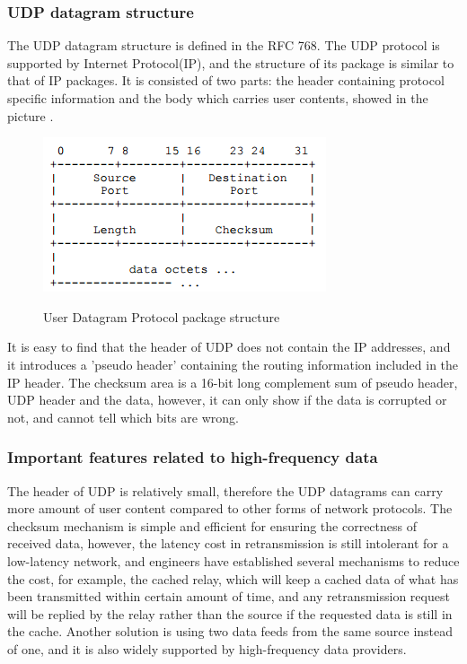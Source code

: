 \documentclass[11pt,openright,a4paper]{report}
\begin{document}
\subsubsection{UDP datagram structure}
The UDP datagram structure is defined in the RFC 768\cite{postel1980user}. The UDP protocol is supported by Internet Protocol(IP), and the structure of its package is similar to that of IP packages. It is consisted of two parts: the header containing protocol specific information and the body which carries user contents, showed in the picture .
\begin{figure}[H]
	\centering
	\includegraphics[width=0.5\linewidth]{picture/UDPStructure}
	\caption{User Datagram Protocol package structure}\cite{postel1980user}
	\label{fig:UDPStructure}
\end{figure}
It is easy to find that the header of UDP does not contain the IP addresses, and it introduces a 'pseudo header' containing the routing information included in the IP header. The checksum area is a 16-bit long complement sum of pseudo header, UDP header and the data, however, it can only show if the data is corrupted or not, and cannot tell which bits are wrong.\\
\subsubsection{Important features related to high-frequency data}
The header of UDP is relatively small, therefore the UDP datagrams can carry more amount of user content compared to other forms of network protocols. The checksum mechanism is simple and efficient for ensuring the correctness of received data, however, the latency cost in retransmission is still intolerant for a low-latency network, and engineers have established several mechanisms to reduce the cost, for example, the cached relay, which will keep a cached data of what has been transmitted within certain amount of time, and any retransmission request will be replied by the relay rather than the source if the requested data is still in the cache. Another solution is using two data feeds from the same source instead of one, and it is also widely supported by high-frequency data providers\cite{abraham2002high}.\\ 
\end{document}
